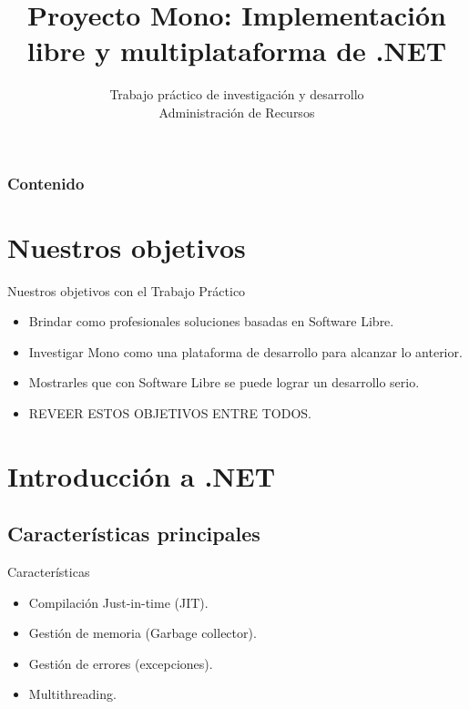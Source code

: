 \documentclass{beamer}
\title[Proyecto Mono]
{Proyecto Mono: Implementación libre y multiplataforma de .NET}
\date[TP Adm. de Recursos]
{Trabajo práctico de investigación y desarrollo \\ Administración de Recursos}
\begin{document}
\begin{frame}
  \titlepage
\end{frame}

\begin{frame}
  \frametitle{Contenido}
  \begin{scriptsize}
  \tableofcontents
  \end{scriptsize}
\end{frame}


\section{Nuestros objetivos}

\begin{frame}{Nuestros objetivos con el Trabajo Práctico}
  \begin{itemize}
    \item Brindar como profesionales soluciones basadas en Software Libre.
    \item Investigar Mono como una plataforma de desarrollo para alcanzar lo anterior.
    \item Mostrarles que con Software Libre se puede lograr un desarrollo serio.
    \item REVEER ESTOS OBJETIVOS ENTRE TODOS.
  \end{itemize}
\end{frame}


\section{Introducción a .NET}

\subsection{Características principales}

\begin{frame}{Características}
  \begin{itemize}
    \item Compilación Just-in-time (JIT).
    \item Gestión de memoria (Garbage collector).
    \item Gestión de errores (excepciones).
    \item Multithreading.
  \end{itemize}
\end{frame}
\end{document}

